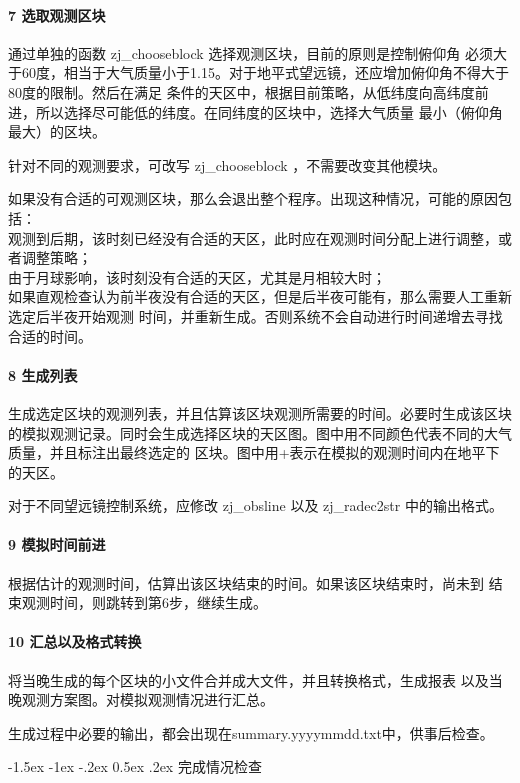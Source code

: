 \documentclass[a4paper,12pt]{article}
\makeatletter
\renewcommand\subsection{\@startsection{subsection}{1}{\z@}%
{-1.5ex \@plus -1ex \@minus -.2ex}%
{0.5ex \@plus.2ex}%
{\normalfont\normalsize\CJKfamily{hei}}}
\makeatother
\begin{document}
\paragraph{7 选取观测区块} 通过单独的函数 zj\_chooseblock 选择观测区块，目前的原则是控制俯仰角
必须大于60度，相当于大气质量小于1.15。对于地平式望远镜，还应增加俯仰角不得大于80度的限制。然后在满足
条件的天区中，根据目前策略，从低纬度向高纬度前进，所以选择尽可能低的纬度。在同纬度的区块中，选择大气质量
最小（俯仰角最大）的区块。

针对不同的观测要求，可改写 zj\_chooseblock ，不需要改变其他模块。

如果没有合适的可观测区块，那么会退出整个程序。出现这种情况，可能的原因包括：\\
观测到后期，该时刻已经没有合适的天区，此时应在观测时间分配上进行调整，或者调整策略；\\
由于月球影响，该时刻没有合适的天区，尤其是月相较大时；\\
如果直观检查认为前半夜没有合适的天区，但是后半夜可能有，那么需要人工重新选定后半夜开始观测
时间，并重新生成。否则系统不会自动进行时间递增去寻找合适的时间。

\paragraph{8 生成列表} 生成选定区块的观测列表，并且估算该区块观测所需要的时间。必要时生成该区块
的模拟观测记录。同时会生成选择区块的天区图。图中用不同颜色代表不同的大气质量，并且标注出最终选定的
区块。图中用+表示在模拟的观测时间内在地平下的天区。

对于不同望远镜控制系统，应修改 zj\_obsline 以及 zj\_radec2str 中的输出格式。

\paragraph{9 模拟时间前进}根据估计的观测时间，估算出该区块结束的时间。如果该区块结束时，尚未到
结束观测时间，则跳转到第6步，继续生成。

\paragraph{10 汇总以及格式转换} 将当晚生成的每个区块的小文件合并成大文件，并且转换格式，生成报表
以及当晚观测方案图。对模拟观测情况进行汇总。

生成过程中必要的输出，都会出现在summary.yyyymmdd.txt中，供事后检查。

\subsection{完成情况检查}
\end{document}
